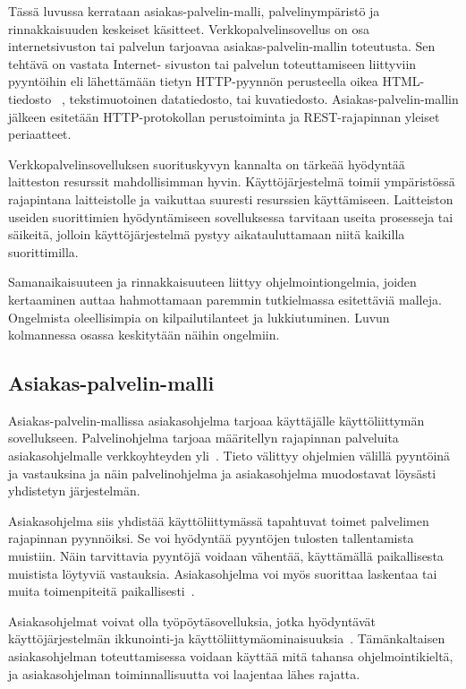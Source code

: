 \documentclass[finnish]{tktltiki2}%
\theoremstyle{definition}
\theoremstyle{remark}
\begin{document}
Tässä luvussa kerrataan
asiakas-palvelin-malli, palvelinympäristö ja rinnakkaisuuden keskeiset käsitteet.
Verkkopalvelinsovellus on osa internetsivuston tai palvelun tarjoavaa
asiakas-palvelin-mallin toteutusta. 
Sen tehtävä on vastata Internet-
sivuston tai palvelun toteuttamiseen
liittyviin pyyntöihin eli lähettämään tietyn HTTP-pyynnön
perusteella oikea HTML-tiedosto~\cite{Berners-Lee_1994}
, tekstimuotoinen datatiedosto, tai kuvatiedosto.
Asiakas-palvelin-mallin jälkeen esitetään
HTTP-protokollan perustoiminta ja REST-rajapinnan yleiset periaatteet.


Verkkopalvelinsovelluksen suorituskyvyn kannalta
on tärkeää hyödyntää laitteston resurssit mahdollisimman hyvin.
Käyttöjärjestelmä toimii ympäristössä rajapintana
laitteistolle ja vaikuttaa suuresti resurssien
käyttämiseen. Laitteiston useiden
suorittimien hyödyntämiseen sovelluksessa tarvitaan useita
prosesseja tai säikeitä, jolloin käyttöjärjestelmä
pystyy aikatauluttamaan niitä kaikilla suorittimilla.

Samanaikaisuuteen ja rinnakkaisuuteen liittyy
ohjelmointiongelmia, joiden kertaaminen
auttaa hahmottamaan paremmin tutkielmassa
esitettäviä malleja. Ongelmista
oleellisimpia on kilpailutilanteet ja lukkiutuminen.
Luvun kolmannessa osassa
keskitytään näihin ongelmiin.

\subsection{Asiakas-palvelin-malli}
Asiakas-palvelin-mallissa
asiakasohjelma tarjoaa käyttäjälle käyttöliittymän sovellukseen. Palvelinohjelma
tarjoaa määritellyn rajapinnan
palveluita asiakasohjelmalle verkkoyhteyden yli~\cite{sinha_client-server_1992}.
Tieto välittyy ohjelmien välillä pyyntöinä ja vastauksina ja näin palvelinohjelma ja
asiakasohjelma
muodostavat löysästi yhdistetyn järjestelmän.

Asiakasohjelma siis yhdistää käyttöliittymässä tapahtuvat toimet palvelimen
rajapinnan pyynnöiksi. Se voi hyödyntää pyyntöjen tulosten tallentamista
muistiin. Näin tarvittavia pyyntöjä voidaan vähentää, käyttämällä
paikallisesta muistista löytyviä vastauksia.
Asiakasohjelma voi myös suorittaa
laskentaa tai muita toimenpiteitä paikallisesti~\cite{sinha_client-server_1992}.

Asiakasohjelmat voivat olla työpöytäsovelluksia, jotka hyödyntävät käyttöjärjestelmän
ikkunointi-ja käyttöliittymäominaisuuksia~\cite{sinha_client-server_1992}.
Tämänkaltaisen asiakasohjelman toteuttamisessa voidaan käyttää mitä tahansa ohjelmointikieltä,
ja asiakasohjelman toiminnallisuutta voi laajentaa lähes rajatta.
\end{document}
